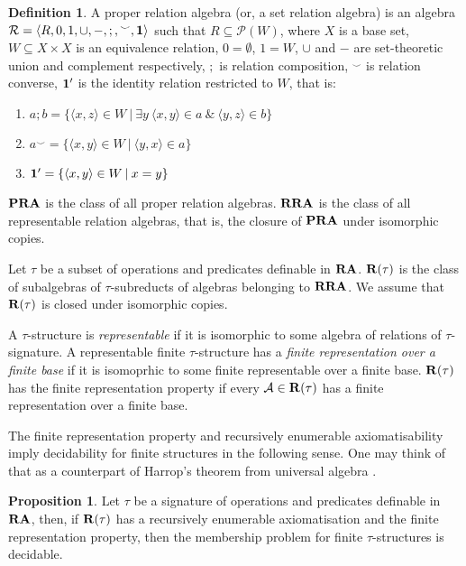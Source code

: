 \documentclass[a4paper]{article}
\theoremstyle{definition}
\newtheorem{definition}{Definition}
\theoremstyle{theorem}
\theoremstyle{proposition}
\newtheorem{proposition}{Proposition}
\theoremstyle{lemma}
\theoremstyle{ex}
\theoremstyle{corollary}
\theoremstyle{claim}
\begin{document}
\begin{definition}
    A proper relation algebra (or, a set relation algebra) is an algebra $\mathcal{R} = \langle R, 0, 1, \cup, -, ;, {}^{\smile}, {\bf 1 }\rangle$ such that $R \subseteq \mathcal{P}(W)$, where $X$ is a base set, $W \subseteq X \times X$ is an equivalence relation, $0 = \emptyset$, $1 = W$, $\cup$ and $-$ are set-theoretic union and complement respectively, $;$ is relation composition, ${}^{\smile}$ is relation converse,
    ${\bf 1}'$ is the identity relation restricted to $W$, that is:
    \begin{enumerate}
    \item $a ; b = \{ \langle x, z \rangle \in W \: | \: \exists y \: \langle x, y \rangle \in a \: \& \: \langle y, z \rangle \in b \}$
    \item $a^{\smile} = \{ \langle x, y \rangle \in W \: | \: \langle y, x \rangle \in a \}$
    \item ${\bf 1}' = \{ \langle x, y \rangle \in W \: | \: x = y \}$
    \end{enumerate}
       ${\bf PRA}$ is the class of all proper relation algebras. ${\bf RRA}$ is the class of all representable relation algebras, that is, the closure of ${\bf PRA}$ under isomorphic copies.
\end{definition}

Let $\tau$ be a subset of operations and predicates definable in ${\bf RA}$. ${\bf R}(\tau)$ is the class of subalgebras of $\tau$-subreducts of algebras belonging to ${\bf RRA}$. We assume that ${\bf R}(\tau)$ is closed under isomorphic copies.

A $\tau$-structure is \emph{representable} if it is isomorphic to some algebra of relations of $\tau$-signature. A representable finite $\tau$-structure has a \emph{finite representation over a finite base} if it is isomoprhic to some finite representable over a finite base. ${\bf R}(\tau)$ has the finite representation property if every $\mathcal{A} \in {\bf R}(\tau)$ has a finite representation over a finite base.

The finite representation property and recursively enumerable axiomatisability imply decidability for finite structures in the following sense. One may think of that as a counterpart of Harrop's theorem from universal algebra \cite{harrop1958existence}.

\begin{proposition}\label{dec}
  Let $\tau$ be a signature of operations and predicates definable in ${\bf RA}$, then, if ${\bf R}(\tau)$ has a recursively enumerable axiomatisation and the finite representation property, then the membership problem for finite $\tau$-structures is decidable.
\end{proposition}
\end{document}

